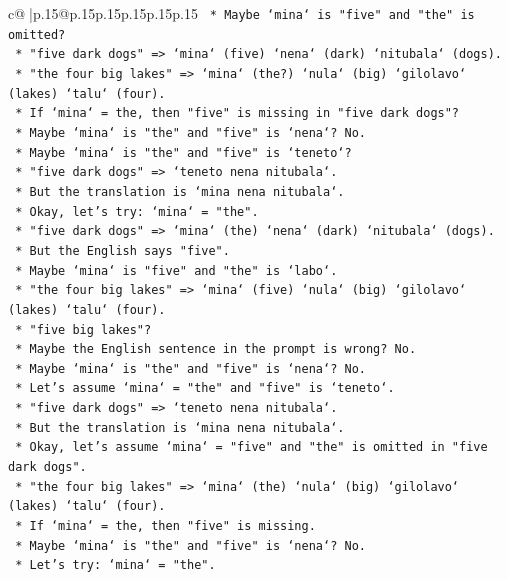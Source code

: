 \documentclass{article}
\begin{document}
{\begin{supertabular}{c@{$\;$}|p{.15\linewidth}@{}p{.15\linewidth}p{.15\linewidth}p{.15\linewidth}p{.15\linewidth}p{.15\linewidth}}
{{{\texttt{    *   Maybe `mina` is "five" and "the" is omitted?} \\
\texttt{    *   "five dark dogs" => `mina` (five) `nena` (dark) `nitubala` (dogs).} \\
\texttt{    *   "the four big lakes" => `mina` (the?) `nula` (big) `gilolavo` (lakes) `talu` (four).} \\
\texttt{    *   If `mina` = the, then "five" is missing in "five dark dogs"?} \\
\texttt{    *   Maybe `mina` is "the" and "five" is `nena`? No.} \\
\texttt{    *   Maybe `mina` is "the" and "five" is `teneto`?} \\
\texttt{    *   "five dark dogs" => `teneto nena nitubala`.} \\
\texttt{    *   But the translation is `mina nena nitubala`.} \\
\texttt{    *   Okay, let's try: `mina` = "the".} \\
\texttt{    *   "five dark dogs" => `mina` (the) `nena` (dark) `nitubala` (dogs).} \\
\texttt{    *   But the English says "five".} \\
\texttt{    *   Maybe `mina` is "five" and "the" is `labo`.} \\
\texttt{    *   "the four big lakes" => `mina` (five) `nula` (big) `gilolavo` (lakes) `talu` (four).} \\
\texttt{    *   "five big lakes"?} \\
\texttt{    *   Maybe the English sentence in the prompt is wrong? No.} \\
\texttt{    *   Maybe `mina` is "the" and "five" is `nena`? No.} \\
\texttt{    *   Let's assume `mina` = "the" and "five" is `teneto`.} \\
\texttt{    *   "five dark dogs" => `teneto nena nitubala`.} \\
\texttt{    *   But the translation is `mina nena nitubala`.} \\
\texttt{    *   Okay, let's assume `mina` = "five" and "the" is omitted in "five dark dogs".} \\
\texttt{    *   "the four big lakes" => `mina` (the) `nula` (big) `gilolavo` (lakes) `talu` (four).} \\
\texttt{    *   If `mina` = the, then "five" is missing.} \\
\texttt{    *   Maybe `mina` is "the" and "five" is `nena`? No.} \\
\texttt{    *   Let's try: `mina` = "the".} \\
}}}
\end{supertabular}}
\end{document}
